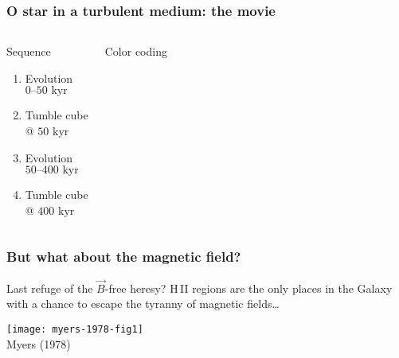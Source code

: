 \documentclass{beamer}
\newcommand\Ref[1]{\textcolor{white!70!black!90!yellow}{#1}}
\begin{document}
\begin{frame}[compact]
\frametitle{O star in a turbulent medium: the movie}
\begin{columns}
\begin{block}{Sequence}
  \begin{enumerate}
  \item Evolution\\ \(\textrm{0--50~kyr}\) 
  \item Tumble cube\\ @ \(\textrm{50~kyr}\)
  \item Evolution\\ \(\textrm{50--400~kyr}\)
  \item Tumble cube\\ @ \(\textrm{400~kyr}\)
  \end{enumerate}
\end{block}
\begin{block}{Color coding}
  \color{red}{[N\,II]}\quad
  \color{green}{H\large\bfseries\begin{greek}a\end{greek}}\quad
  \color{blue}{[O\,III]}
\end{block}
\end{columns}
\end{frame}

\begin{frame}
  \frametitle{But what about the magnetic field?}
  \begin{alertblock}{Last refuge of the \(\vec{B}\)-free heresy?}
    H\,II regions are the only places in the Galaxy with a chance to
    escape the tyranny
    of magnetic fields\dots\par\centering
    \texttt{[image: myers-1978-fig1]}\\
    \Ref{Myers (1978)}
  \end{alertblock}
\end{frame}
\end{document}
